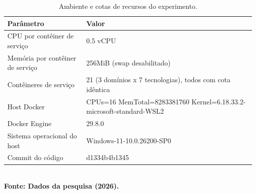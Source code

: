 \begin{table}[H]
\centering
\small
\caption{Ambiente e cotas de recursos do experimento.}
\label{tab:ambiente}
\begin{tabular}{|l|l|}
\hline
\textbf{Parâmetro} & \textbf{Valor} \\ \hline
CPU por contêiner de serviço & 0.5 vCPU \\ \hline
Memória por contêiner de serviço & 256MiB (swap desabilitado) \\ \hline
Contêineres de serviço & 21 (3 domínios x 7 tecnologias), todos com cota idêntica \\ \hline
Host Docker & CPUs=16 MemTotal=8283381760 Kernel=6.18.33.2-microsoft-standard-WSL2 \\ \hline
Docker Engine & 29.8.0 \\ \hline
Sistema operacional do host & Windows-11-10.0.26200-SP0 \\ \hline
Commit do código & d1334b4b1345 \\ \hline
\end{tabular}
{\footnotesize\\ \textbf{Fonte: Dados da pesquisa (2026).}}
\end{table}
